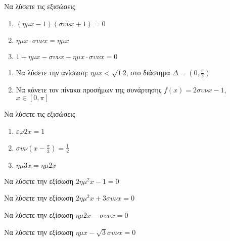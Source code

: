 \documentclass{../presentation}
\begin{document}
\begin{askisi}
  Να λύσετε τις εξισώσεις
  \begin{enumerate}
    \item<1-> $(ημx-1)(συνx+1)=0$
    \item<2-> $ημx\cdot συνx=ημx$
    \item<3-> $1+ημx-συνx-ημx\cdot συνx=0$
  \end{enumerate}

\end{askisi}

\begin{askisi}
  \begin{enumerate}
    \item<1-> Να λύσετε την ανίσωση: $ημx<\sqrt{1}{2}$, στο διάστημα $Δ=(0,\frac{π}{2})$
    \item<2-> Να κάνετε τον πίνακα προσήμων της συνάρτησης $f(x)=2συνx-1$, $x\in [0,π]$
  \end{enumerate}

\end{askisi}

\begin{askisi}
  Να λύσετε τις εξισώσεις
  \begin{enumerate}
    \item<1-> $εφ2x=1$
    \item<2-> $συν(x-\frac{π}{3})=\frac{1}{2}$
    \item<3-> $ημ3x=ημ2x$
  \end{enumerate}

\end{askisi}

\begin{askisi}
  Να λύσετε την εξίσωση $2ημ^2x-1=0$

\end{askisi}

\begin{askisi}
  Να λύσετε την εξίσωση $2ημ^2x+3συνx=0$

\end{askisi}

\begin{askisi}
  Να λύσετε την εξίσωση $ημ2x-συνx=0$

\end{askisi}

\begin{askisi}
  Να λύσετε την εξίσωση $ημx-\sqrt{3}συνx=0$

\end{askisi}
\end{document}
